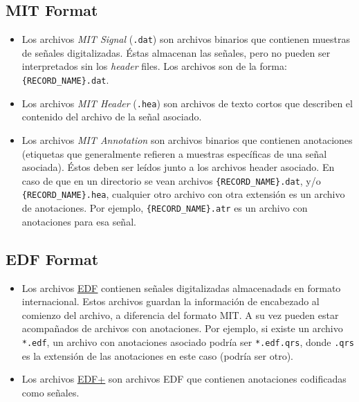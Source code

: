 \subsection*{MIT Format}
\begin{itemize}
  \item Los archivos \textit{MIT Signal} (\texttt{.dat}) son archivos binarios que contienen muestras de señales digitalizadas. Éstas almacenan las señales, pero no pueden ser interpretados sin los \textit{header} files. Los archivos son de la forma: \texttt{\{RECORD\_NAME\}.dat}.
  \item Los archivos \textit{MIT Header} (\texttt{.hea}) son archivos de texto cortos que describen el contenido del archivo de la señal asociado.
  \item Los archivos \textit{MIT Annotation} son archivos binarios que contienen anotaciones (etiquetas que generalmente refieren a muestras específicas de una señal asociada). Éstos deben ser leídos junto a los archivos header asociado. En caso de que en un directorio se vean archivos \texttt{\{RECORD\_NAME\}.dat}, y/o \texttt{\{RECORD\_NAME\}.hea}, cualquier otro archivo con otra extensión es un archivo de anotaciones. Por ejemplo, \texttt{\{RECORD\_NAME\}.atr} es un archivo con anotaciones para esa señal.
\end{itemize}

\subsection*{EDF Format}
\begin{itemize}
  \item Los archivos \href{http://www.edfplus.info/specs/edf.html}{\underline{EDF}} contienen señales digitalizadas almacenadads en formato internacional. Estos archivos guardan la información de encabezado al comienzo del archivo, a diferencia del formato MIT. A su vez pueden estar acompañados de archivos con anotaciones. Por ejemplo, si existe un archivo \texttt{*.edf}, un archivo con anotaciones asociado podría ser \texttt{*.edf.qrs}, donde \texttt{.qrs} es la extensión de las anotaciones en este caso (podría ser otro).
  \item Los archivos
  \href{http://www.edfplus.info/specs/edfplus.html}{\underline{EDF+}} son archivos EDF que contienen anotaciones codificadas como señales.
\end{itemize}

